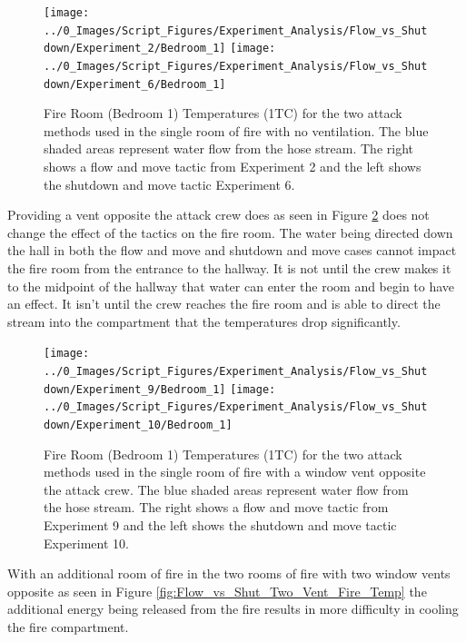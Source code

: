 \documentclass[12pt,oneside]{book}
\begin{document}
\begin{figure}[H]
\centering
\texttt{[image: ../0\_Images/Script\_Figures/Experiment\_Analysis/Flow\_vs\_Shutdown/Experiment\_2/Bedroom\_1]}
\texttt{[image: ../0\_Images/Script\_Figures/Experiment\_Analysis/Flow\_vs\_Shutdown/Experiment\_6/Bedroom\_1]}
\caption[Single Room - No Vent - Flow \& Move vs. Shutdown \& Move - Bedroom 1 Temperature]{Fire Room (Bedroom 1) Temperatures (1TC) for the two attack methods used in the single room of fire with no ventilation. The blue shaded areas represent water flow from the hose stream. The right shows a flow and move tactic from Experiment 2 and the left shows the shutdown and move tactic Experiment 6.}
\label{fig:Flow_vs_Shut_Single_No_Vent_Fire_Temp}
\end{figure}

Providing a vent opposite the attack crew does as seen in Figure \ref{fig:Flow_vs_Shut_Single_Vent_Fire_Temp} does not change the effect of the tactics on the fire room. The water being directed down the hall in both the flow and move and shutdown and move cases cannot impact the fire room from the entrance to the hallway. It is not until the crew makes it to the midpoint of the hallway that water can enter the room and begin to have an effect. It isn't until the crew reaches the fire room and is able to direct the stream into the compartment that the temperatures drop significantly.  

\begin{figure}[H]
\centering
\texttt{[image: ../0\_Images/Script\_Figures/Experiment\_Analysis/Flow\_vs\_Shutdown/Experiment\_9/Bedroom\_1]}
\texttt{[image: ../0\_Images/Script\_Figures/Experiment\_Analysis/Flow\_vs\_Shutdown/Experiment\_10/Bedroom\_1]}
\caption[Single Room - Window Vent Opposite - Flow \& Move vs. Shutdown \& Move - Bedroom 1 Temperature]{Fire Room (Bedroom 1) Temperatures (1TC) for the two attack methods used in the single room of fire with a window vent opposite the attack crew. The blue shaded areas represent water flow from the hose stream. The right shows a flow and move tactic from Experiment 9 and the left shows the shutdown and move tactic Experiment 10.}
\label{fig:Flow_vs_Shut_Single_Vent_Fire_Temp}
\end{figure}

With an additional room of fire in the two rooms of fire with two window vents opposite as seen in Figure \ref{fig:Flow_vs_Shut_Two_Vent_Fire_Temp} the additional energy being released from the fire results in more difficulty in cooling the fire compartment.  
\end{document}
